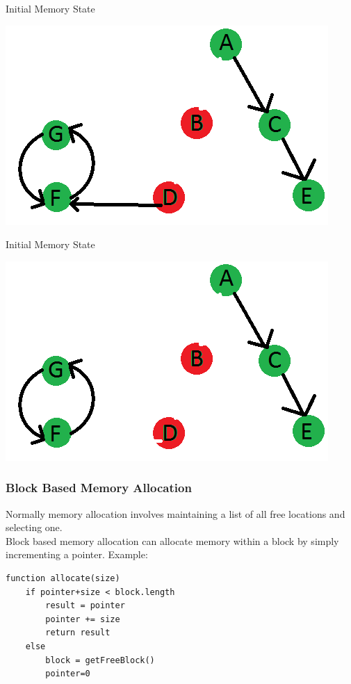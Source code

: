 \documentclass{beamer}
\begin{document}
\begin{frame}{Initial Memory State}
	\begin{center}
		\includegraphics[width=\textwidth]{graphics/memState2.png}
	\end{center}
\end{frame}
\begin{frame}{Initial Memory State}
	\begin{center}
		\includegraphics[width=\textwidth]{graphics/memState3.png}
	\end{center}
\end{frame}

\begin{frame}[fragile]
\frametitle{Block Based Memory Allocation}
	Normally memory allocation involves maintaining a list of all free locations and selecting one.\\
	
	Block based memory allocation can allocate memory within a block by simply incrementing a pointer. Example:
\begin{lstlisting}[caption=Bump Pointer Memory Allocation]
function allocate(size)
    if pointer+size < block.length
        result = pointer
        pointer += size
        return result
    else
        block = getFreeBlock()
        pointer=0
\end{lstlisting}

\end{frame}
\end{document}
